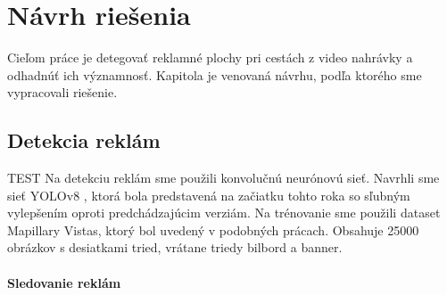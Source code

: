 \chapter{Návrh riešenia}\label{chap:proposal}

Cieľom práce je detegovať reklamné plochy pri cestách z video nahrávky a odhadnúť ich významnosť. Kapitola je venovaná návrhu, podľa ktorého sme vypracovali riešenie.  



\section{Detekcia reklám}

TEST Na detekciu reklám sme použili konvolučnú neurónovú sieť. Navrhli sme sieť YOLOv8 \cite{yolov8}, ktorá bola predstavená na začiatku tohto roka so sľubným vylepšením oproti predchádzajúcim verziám. Na trénovanie sme použili dataset Mapillary Vistas, ktorý bol uvedený v podobných prácach. Obsahuje 25000 obrázkov s desiatkami tried, vrátane triedy bilbord a banner.



\subsubsection{Sledovanie reklám}


